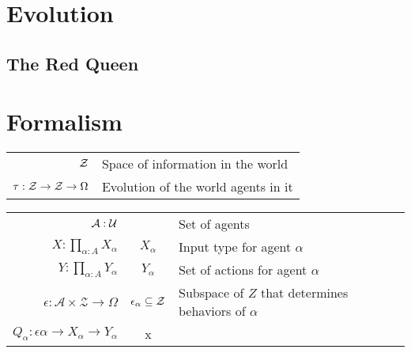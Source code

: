 \documentclass{article}
\theoremstyle{definition}
\newcommand{\Z}{\mathcal Z}
\begin{document}
	\section{Evolution}
	
	
	\subsection{The Red Queen}
	
	\section{Formalism}
	
	\begin{tabular}{r|l}
		$\cal Z$ & Space of information in the world \\
		$\tau: {\cal Z \to Z} \to \Omega$ & Evolution of the world agents in it \\
	\end{tabular}
	\vspace{1em}
	
	
	\begin{tabular}{r|c|l}		
		$\cal A : U$ && Set of agents \\[0.3em]
		$\displaystyle X: \prod_{\alpha: A} X_\alpha$ & $X_\alpha$ & Input type for agent $\alpha$ \\[1.7em]
		$\displaystyle Y: \prod_{\alpha: A} Y_\alpha$ &$Y_\alpha$ & Set of actions for agent $\alpha$ \\
		$\displaystyle \epsilon: \mathcal A \times \Z \to \Omega $&$\epsilon_\alpha \subseteq \cal Z$ & Subspace of $Z$ that determines behaviors of $\alpha$ \\
		$Q_\alpha: \epsilon\alpha \to X_\alpha \to Y_\alpha$ & x 
	\end{tabular}
	
\end{document}

